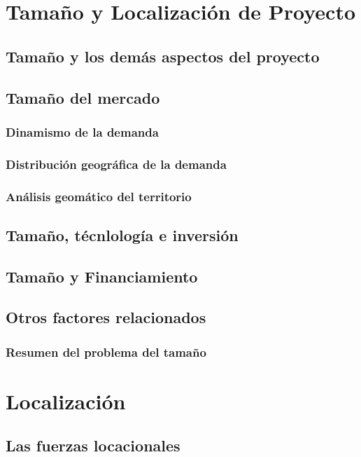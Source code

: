 \documentclass[crop=false]{standalone}
\begin{document}
\section{Tamaño y Localización de Proyecto}

\subsection{Tamaño y los demás aspectos del proyecto}
\subsection{Tamaño del mercado}

\subsubsection{Dinamismo de la demanda}
\subsubsection{Distribución geográfica de la demanda}
\subsubsection{Análisis geomático del territorio}

\subsection{Tamaño, técnlología e inversión}
\subsection{Tamaño y Financiamiento}
\subsection{Otros factores relacionados}
\subsubsection{Resumen del problema del tamaño}


\section{Localización}

\subsection{Las fuerzas locacionales}
\end{document}
